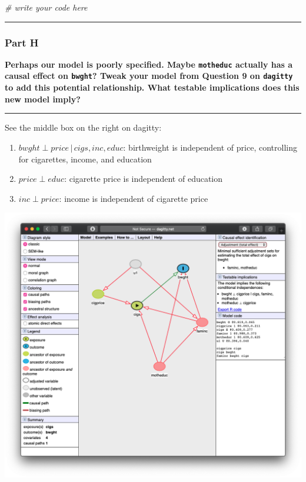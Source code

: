 \documentclass[
]{article}
\newenvironment{Shaded}{\begin{snugshade}}{\end{snugshade}}
\newcommand{\CommentTok}[1]{\textcolor[rgb]{0.56,0.35,0.01}{\textit{#1}}}
\begin{document}
\begin{Shaded}
\begin{Highlighting}[]
\CommentTok{\# write your code here}
\end{Highlighting}
\end{Shaded}

\begin{center}\rule{0.5\linewidth}{0.5pt}\end{center}

\hypertarget{part-h}{%
\subsubsection{Part H}\label{part-h}}

\textbf{Perhaps our model is poorly specified. Maybe \texttt{motheduc}
actually has a causal effect on \texttt{bwght}? Tweak your model from
Question 9 on \texttt{dagitty} to add this potential relationship. What
testable implications does this new model imply?}

\begin{center}\rule{0.5\linewidth}{0.5pt}\end{center}

See the middle box on the right on dagitty:

\begin{enumerate}
\def\labelenumi{\arabic{enumi}.}
\item
  \(bwght \perp price \, | \, cigs, inc, educ\): birthweight is
  independent of price, controlling for cigarettes, income, and
  education
\item
  \(price \perp educ\): cigarette price is independent of education
\item
  \(inc \perp price\): income is independent of cigarette price
\end{enumerate}

\includegraphics{../images/10dagitty.png}
\end{document}
